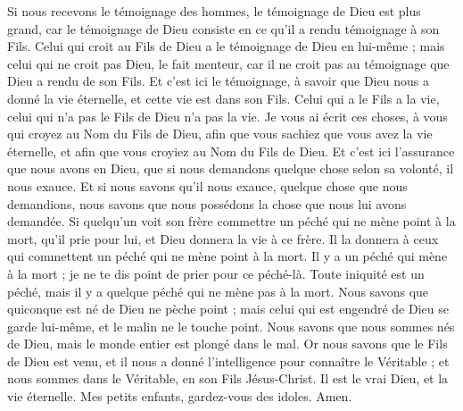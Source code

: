 \begin{multicols}{2}
Si nous recevons le témoignage des hommes, le témoignage de Dieu est plus grand, car le témoignage de Dieu consiste en ce qu’il a rendu témoignage à son Fils.
Celui qui croit au Fils de Dieu a le témoignage de Dieu en lui-même ; mais celui qui ne croit pas Dieu, le fait menteur, car il ne croit pas au témoignage que Dieu a rendu de son Fils.
Et c'est ici le témoignage, à savoir que Dieu nous a donné la vie éternelle, et cette vie est dans son Fils.
Celui qui a le Fils a la vie, celui qui n'a pas le Fils de Dieu n'a pas la vie.
Je vous ai écrit ces choses, à vous qui croyez au Nom du Fils de Dieu, afin que vous sachiez que vous avez la vie éternelle, et afin que vous croyiez au Nom du Fils de Dieu.
Et c'est ici l’assurance que nous avons en Dieu, que si nous demandons quelque chose selon sa volonté, il nous exauce.
Et si nous savons qu'il nous exauce, quelque chose que nous demandions, nous savons que nous possédons la chose que nous lui avons demandée.
Si quelqu'un voit son frère commettre un péché qui ne mène point à la mort, qu’il prie pour lui, et Dieu donnera la vie à ce frère. Il la donnera à ceux qui commettent un péché qui ne mène point à la mort. Il y a un péché qui mène à la mort ; je ne te dis point de prier pour ce péché-là.
Toute iniquité est un péché, mais il y a quelque péché qui ne mène pas à la mort.
Nous savons que quiconque est né de Dieu ne pèche point ; mais celui qui est engendré de Dieu se garde lui-même, et le malin ne le touche point.
Nous savons que nous sommes nés de Dieu, mais le monde entier est plongé dans le mal.
\TextTitle{[Conclusion]}
Or nous savons que le Fils de Dieu est venu, et il nous a donné l'intelligence pour connaître le Véritable ; et nous sommes dans le Véritable, en son Fils Jésus-Christ. Il est le vrai Dieu, et la vie éternelle.
Mes petits enfants, gardez-vous des idoles. Amen.
\PPE{}
\end{multicols}
